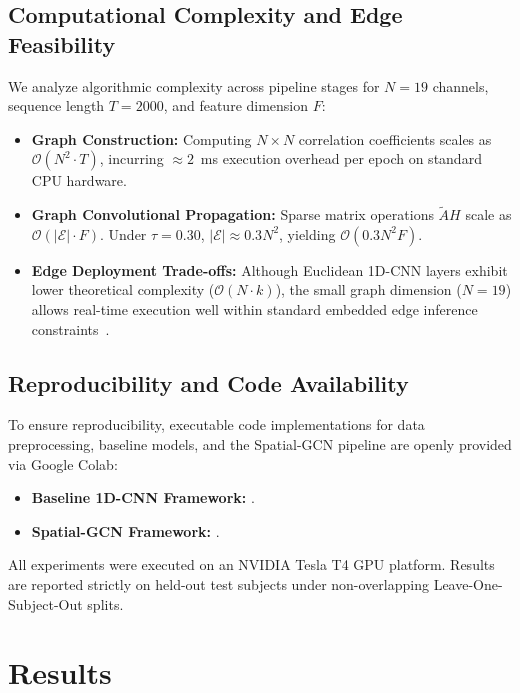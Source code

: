 \documentclass[journal]{IEEEtran}
\begin{document}
\subsection{Computational Complexity and Edge Feasibility}
We analyze algorithmic complexity across pipeline stages for $N=19$ channels, sequence length $T=2000$, and feature dimension $F$:
\begin{itemize}
    \item \textbf{Graph Construction:} Computing $N \times N$ correlation coefficients scales as $\mathcal{O}(N^2 \cdot T)$, incurring $\approx 2$~ms execution overhead per epoch on standard CPU hardware.
    \item \textbf{Graph Convolutional Propagation:} Sparse matrix operations $\tilde{A}H$ scale as $\mathcal{O}(|\mathcal{E}| \cdot F)$. Under $\tau = 0.30$, $|\mathcal{E}| \approx 0.3 N^2$, yielding $\mathcal{O}(0.3 N^2 F)$.
    \item \textbf{Edge Deployment Trade-offs:} Although Euclidean 1D-CNN layers exhibit lower theoretical complexity ($\mathcal{O}(N \cdot k)$), the small graph dimension ($N=19$) allows real-time execution well within standard embedded edge inference constraints~\cite{chenran2019, narendra2026}.
\end{itemize}

\subsection{Reproducibility and Code Availability}
To ensure reproducibility, executable code implementations for data preprocessing, baseline models, and the Spatial-GCN pipeline are openly provided via Google Colab:
\begin{itemize}
    \item \textbf{Baseline 1D-CNN Framework:} \cite{colab1}.
    \item \textbf{Spatial-GCN Framework:} \cite{colab2}.
\end{itemize}
All experiments were executed on an NVIDIA Tesla T4 GPU platform. Results are reported strictly on held-out test subjects under non-overlapping Leave-One-Subject-Out splits.

\section{Results}
\end{document}
